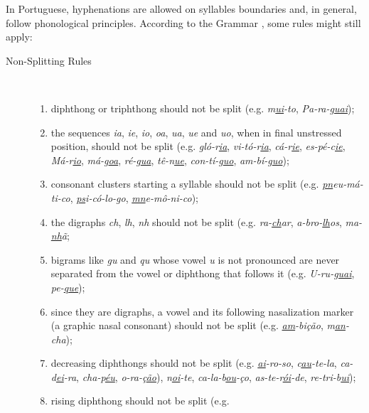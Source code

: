 In Portuguese, hyphenations are allowed on syllables boundaries and, in
general, follow phonological principles.  According to the Grammar
\parencite{cunha2016,bergstrom2011,cegalla2008}, some rules might still apply:
\begin{description}
    \item[Non-Splitting Rules]\  

\begin{enumerate}
    \item\label{rule-di-triphthong} diphthong or triphthong should not be split
	(e.g. \emph{m\underline{ui}-to}, \emph{Pa-ra-g\underline{uai}});
    \item\label{rule-unstressed} the sequences \emph{ia}, \emph{ie}, \emph{io}, \emph{oa}, \emph{ua},
	\emph{ue} and \emph{uo}, when in final unstressed position, should not be split 
	(e.g. \emph{gló-r\underline{ia}}, \emph{vi-tó-r\underline{ia}}, 
	\emph{cá-r\underline{ie}}, \emph{es-pé-c\underline{ie}}, 
	\emph{Má-r\underline{io}}, \emph{má-g\underline{oa}}, 
	\emph{ré-g\underline{ua}}, \emph{tê-n\underline{ue}}, 
	\emph{con-tí-g\underline{uo}}, \emph{am-bí-g\underline{uo}});
    \item\label{rule-c-clusters} consonant clusters starting a syllable should not be
	split (e.g. \emph{\underline{pn}eu-má-ti-co}, \emph{\underline{ps}i-có-lo-go}, 
	\emph{\underline{mn}e-mô-ni-co});
    \item\label{rules-digraphs-ns} the digraphs	\emph{ch}, \emph{lh}, \emph{nh}
	should not be split (e.g. \emph{ra-\underline{ch}ar},
	\emph{a-bro-\underline{lh}os}, \emph{ma-\underline{nh}ã};
    \item\label{rule-guqu} bigrams like \emph{gu} and \emph{qu} whose vowel \emph{u} is not 
	pronounced are never separated from the vowel or diphthong that follows it 
	(e.g. \emph{U-ru-\underline{guai}}, \emph{pe-\underline{que}});
    \item\label{rule-nasalization} since they are digraphs, a vowel and its following 
	nasalization marker (a graphic nasal consonant) should not be split (e.g. \emph{\underline{am}-bição},
	\emph{m\underline{an}-cha});
    \item\label{rule-decreasing} decreasing diphthongs should not be split (e.g. 
	\emph{\underline{ai}-ro-so}, \emph{c\underline{au}-te-la}, \emph{ca-d\underline{ei}-ra}, \emph{cha-p\underline{éu}},
	\emph{o-ra-ç\underline{ão}}), \emph{n\underline{oi}-te}, \emph{ca-la-b\underline{ou}-ço}, \emph{as-te-r\underline{ói}-de},
  \emph{re-tri-b\underline{ui}});
    \item\label{rule-rising} rising diphthong should not be split (e.g.

\end{enumerate}
\end{description}
